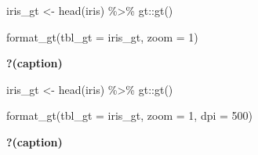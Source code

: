 \documentclass[
]{article}
\newenvironment{Shaded}{\begin{snugshade}}{\end{snugshade}}
\newcommand{\AttributeTok}[1]{\textcolor[rgb]{0.40,0.45,0.13}{#1}}
\newcommand{\DecValTok}[1]{\textcolor[rgb]{0.68,0.00,0.00}{#1}}
\newcommand{\FunctionTok}[1]{\textcolor[rgb]{0.28,0.35,0.67}{#1}}
\newcommand{\NormalTok}[1]{\textcolor[rgb]{0.00,0.23,0.31}{#1}}
\newcommand{\OtherTok}[1]{\textcolor[rgb]{0.00,0.23,0.31}{#1}}
\newcommand{\SpecialCharTok}[1]{\textcolor[rgb]{0.37,0.37,0.37}{#1}}
\begin{document}
\begin{Shaded}
\begin{Highlighting}[]
\NormalTok{iris\_gt }\OtherTok{\textless{}{-}} \FunctionTok{head}\NormalTok{(iris) }\SpecialCharTok{\%\textgreater{}\%} 
\NormalTok{  gt}\SpecialCharTok{::}\FunctionTok{gt}\NormalTok{()}

\FunctionTok{format\_gt}\NormalTok{(}\AttributeTok{tbl\_gt =}\NormalTok{ iris\_gt, }\AttributeTok{zoom =} \DecValTok{1}\NormalTok{)}
\end{Highlighting}
\end{Shaded}

\begin{table}

\caption{\textbf{?(caption)}}\begin{minipage}[t]{\linewidth}

{\centering 


}

\end{minipage}%

\end{table}

\begin{Shaded}
\begin{Highlighting}[]
\NormalTok{iris\_gt }\OtherTok{\textless{}{-}} \FunctionTok{head}\NormalTok{(iris) }\SpecialCharTok{\%\textgreater{}\%} 
\NormalTok{  gt}\SpecialCharTok{::}\FunctionTok{gt}\NormalTok{()}

\FunctionTok{format\_gt}\NormalTok{(}\AttributeTok{tbl\_gt =}\NormalTok{ iris\_gt, }\AttributeTok{zoom =} \DecValTok{1}\NormalTok{, }\AttributeTok{dpi =} \DecValTok{500}\NormalTok{)}
\end{Highlighting}
\end{Shaded}

\begin{table}

\caption{\textbf{?(caption)}}\begin{minipage}[t]{\linewidth}

{\centering 


}

\end{minipage}%

\end{table}
\end{document}

